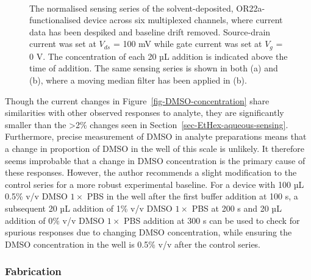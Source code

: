 \documentclass[
  a4paper,
]{scrbook}
\begin{document}
\begin{figure}
\begin{minipage}[t]{0.70\linewidth}
{{}

}

\end{minipage}%
%
\begin{minipage}[t]{0.15\linewidth}

{\centering 

~

}

\end{minipage}%

\caption{\label{fig-solvent-deposited-sensing}The normalised sensing
series of the solvent-deposited, OR22a-functionalised device across six
multiplexed channels, where current data has been despiked and baseline
drift removed. Source-drain current was set at \(V_{ds}\) = 100 mV while
gate current was set at \(V_g\) = 0 V. The concentration of each 20 µL
addition is indicated above the time of addition. The same sensing
series is shown in both (a) and (b), where a moving median filter has
been applied in (b).}

\end{figure}

Though the current changes in Figure~\ref{fig-DMSO-concentration} share
similarities with other observed responses to analyte, they are
significantly smaller than the \textgreater2\% changes seen in
Section~\ref{sec-EtHex-aqueous-sensing}. Furthermore, precise
measurement of DMSO in analyte preparations means that a change in
proportion of DMSO in the well of this scale is unlikely. It therefore
seems improbable that a change in DMSO concentration is the primary
cause of these responses. However, the author recommends a slight
modification to the control series for a more robust experimental
baseline. For a device with 100 µL 0.5\% v/v DMSO \(1 \times\) PBS in
the well after the first buffer addition at 100 s, a subsequent 20 µL
addition of 1\% v/v DMSO \(1 \times\) PBS at 200 s and 20 µL addition of
0\% v/v DMSO \(1 \times\) PBS addition at 300 s can be used to check for
spurious responses due to changing DMSO concentration, while ensuring
the DMSO concentration in the well is 0.5\% v/v after the control
series.

\hypertarget{fabrication}{%
\subsubsection*{Fabrication}\label{fabrication}}
\end{document}

